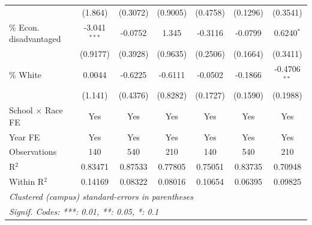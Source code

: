 \documentclass[hidelinks,twoside]{article}
\begin{document}
\begin{table}
\begin{tabular}{lcccccc}
                                            & (1.864)        & (0.3072)       & (0.9005)      & (0.4758)      & (0.1296)        & (0.3541)\\   
   \% Econ. disadvantaged                         & -3.041$^{***}$ & -0.0752        & 1.345         & -0.3116       & -0.0799         & 0.6240$^{*}$\\   
                                            & (0.9177)       & (0.3928)       & (0.9635)      & (0.2506)      & (0.1664)        & (0.3411)\\   
   \% White                           & 0.0044         & -0.6225        & -0.6111       & -0.0502       & -0.1866         & -0.4706$^{**}$\\   
                                            & (1.141)        & (0.4376)       & (0.8282)      & (0.1727)      & (0.1590)        & (0.1988)\\   
   \midrule
   School $\times$ Race FE                                   & Yes            & Yes            & Yes           & Yes           & Yes             & Yes\\  
   Year FE                                    & Yes            & Yes            & Yes           & Yes           & Yes             & Yes\\  
   \midrule
   Observations                             & 140            & 540            & 210           & 140           & 540             & 210\\  
   R$^2$                                    & 0.83471        & 0.87533        & 0.77805       & 0.75051       & 0.83735         & 0.70948\\  
   Within R$^2$                             & 0.14169        & 0.08322        & 0.08016       & 0.10654       & 0.06395         & 0.09825\\  
   \midrule \midrule
   \multicolumn{7}{l}{\emph{Clustered (campus) standard-errors in parentheses}}\\
   \multicolumn{7}{l}{\emph{Signif. Codes: ***: 0.01, **: 0.05, *: 0.1}}\\
\end{tabular}
\end{table}
\end{document}
